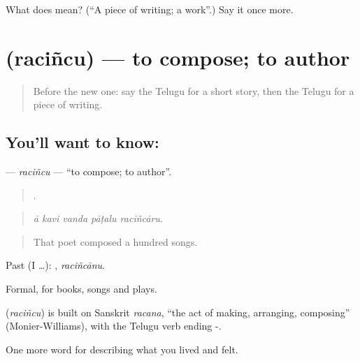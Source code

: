 \begin{tcolorbox}[breakable,colback=teal!4,colframe=teal!35!black,title={Before you move on}]
What does  mean? (\textquotedblleft{}A piece of writing; a work\textquotedblright{}.) Say it once more.
\end{tcolorbox}
\section[\texorpdfstring{\te{రచించు} (raciñcu)}{రచించు (raciñcu)}]{ (raciñcu) — to compose; to author}

\label{lesson:TE-C540-racincu}



\begin{quote}
Before the new one: say the Telugu for a short story, then the Telugu for a piece of writing.
\end{quote}

\subsection*{You'll want to know: }
\textbf{} — \emph{raciñcu} — \textquotedblleft{}to compose; to author\textquotedblright{}.

\begin{quote}
    .
\end{quote}

\begin{quote}
\emph{ā kavi vanda pāṭalu raciñcāru.}
\end{quote}

\begin{quote}
That poet composed a hundred songs.
\end{quote}

Past (I …): , \emph{raciñcānu}.

Formal, for books, songs and plays.

\begin{cousinweb}
\textbf{} (\emph{raciñcu}) is built on Sanskrit \emph{racana}, \textquotedblleft{}the act of making, arranging, composing\textquotedblright{} (Monier-Williams), with the Telugu verb ending -.
\end{cousinweb}

\begin{grammarlens}[title={What you've built}]
One more word for describing what you lived and felt.
\end{grammarlens}

